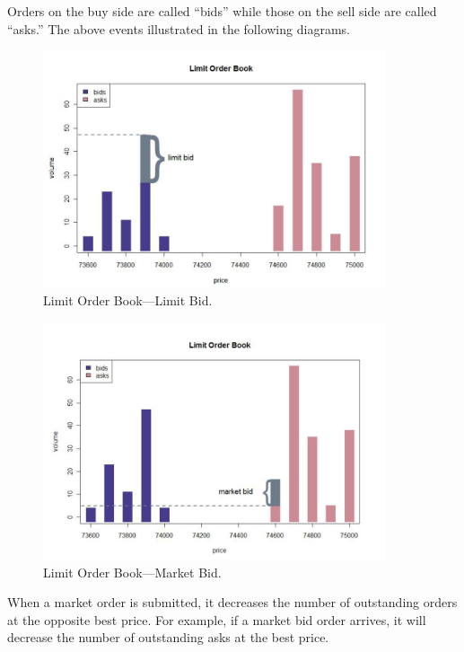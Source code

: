 Orders on the buy side are called ``bids'' while those on the sell side are called ``asks.'' The above events illustrated in the following diagrams.
	\begin{figure}[!ht]
	   \centering
	   \includegraphics[width=0.9\textwidth]{chapters/chapter_el_exch/figures/limitbk1.png} 
	   \caption{Limit Order Book---Limit Bid. \label{fig:limbk1}}
	\end{figure}
	\begin{figure}[!ht]
	   \centering
	   \includegraphics[width=0.9\textwidth]{chapters/chapter_el_exch/figures/limitbk2.png} 
	   \caption{Limit Order Book---Market Bid. \label{fig:limbk2}}
	\end{figure}
When a market order is submitted, it decreases the number of outstanding orders at the opposite best price. For example, if a market bid order arrives, it will decrease the number of outstanding asks at the best price.
